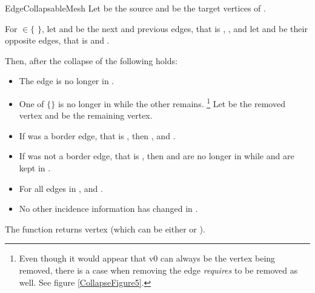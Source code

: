 \begin{ccRefConcept}{EdgeCollapsableMesh}
\smallskip
Let  be the source and  be the target vertices of .

For  $\in \{$  $\}$, let  and  be the next and previous 
edges, that is , , and let 
 and  be their opposite edges, that is 
 and .

Then, after the collapse of  the following holds:

\begin{itemize}
\item The edge  is no longer in .
\item One of $\{$$\}$ is no longer in  while the other remains.
\footnote{Even though it would appear that v0 can always be the vertex being removed, there is a case when removing the edge  {\em requires}  to be removed as well. See figure \ref{CollapseFigure5}.}
Let  be the removed vertex and  be the remaining vertex.
\item If  was a border edge, that is , then , and .
\item If  was not a border edge, that is , then  and  are no longer in  while  and  are kept in .
\item For all edges  in ,  and .
\item No other incidence information has changed in .
\end{itemize}

The function returns vertex  (which can be either  or ). 


\end{ccRefConcept}
